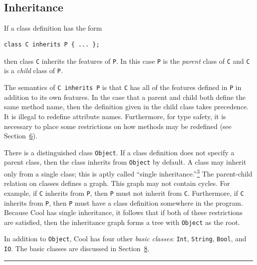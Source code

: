 \documentclass[]{article}
\begin{document}
\subsection{\\ Inheritance}

If a class definition has the form

\begin{verbatim}
class C inherits P { ... };
\end{verbatim}

then class \texttt{C} inherits the features of \texttt{P}. In this case
\texttt{P} is the \emph{parent} class of \texttt{C} and \texttt{C} is a
\emph{child} class of \texttt{P}.

The semantics of \texttt{C inherits P} is that \texttt{C} has all of the
features defined in \texttt{P} in addition to its own features. In the
case that a parent and child both define the same method name, then the
definition given in the child class takes precedence. It is illegal to
redefine attribute names. Furthermore, for type safety, it is necessary
to place some restrictions on how methods may be redefined (see
Section~\href{node12.html\#sec-method}{6}).

There is a distinguished class \texttt{Object}. If a class definition
does not specify a parent class, then the class inherits from
\texttt{Object} by default. A class may inherit only from a single
class; this is aptly called ``single
inheritance.''\href{footnode.html\#foot386}{\textsuperscript{3}} The
parent-child relation on classes defines a graph. This graph may not
contain cycles. For example, if \texttt{C} inherits from \texttt{P},
then \texttt{P} must not inherit from \texttt{C}. Furthermore, if
\texttt{C} inherits from \texttt{P}, then \texttt{P} must have a class
definition somewhere in the program. Because Cool has single
inheritance, it follows that if both of these restrictions are
satisfied, then the inheritance graph forms a tree with \texttt{Object}
as the root.

In addition to \texttt{Object}, Cool has four other \emph{basic
classes}: \texttt{Int}, \texttt{String}, \texttt{Bool}, and \texttt{IO}.
The basic classes are discussed in
Section~\href{node26.html\#sec-basic}{8}.

\begin{center}\rule{3in}{0.4pt}\end{center}
\end{document}
